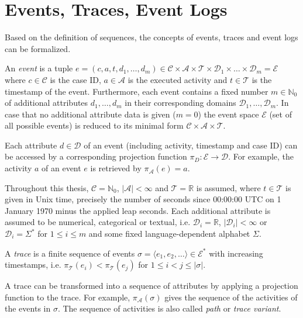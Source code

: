 \section{Events, Traces, Event Logs}

Based on the definition of sequences, the concepts of events, traces and event logs can be formalized.

\begin{definition}[Event]
An  \textit{event} is a tuple $e = (c,a,t,d_1,\dots, d_m) \in \mathcal{C} \times \mathcal{A}  \times \mathcal{T} \times \mathcal{D}_1 \times \dots \times \mathcal{D}_m =  \mathcal{E}$ where  $c \in \mathcal{C} $ is the case ID, $a \in \mathcal{A}$ is the executed activity and $t \in \mathcal{T}$ is the timestamp of the event.
Furthermore, each event contains a fixed number $m \in \mathbb{N}_0$ of additional attributes $d_1, \dots, d_m$ in their corresponding domains $\mathcal{D}_1, \dots , \mathcal{D}_m$.
In case that no additional attribute data is given ($m = 0$) the event space $\mathcal{E}$ (set of all possible events) is reduced to its minimal form $\mathcal{C} \times \mathcal{A}  \times \mathcal{T}$.
\end{definition}

Each attribute $d \in \mathcal{D}$ of an event (including activity, timestamp and case ID) can be accessed by a corresponding projection function $\pi_D \colon \mathcal{E} \to \mathcal{D}$.
For example, the activity $a$ of an event $e$ is retrieved by $\pi_\mathcal{A}(e) = a$.

Throughout this thesis,  $\mathcal{C} = \mathbb{N}_0$, $|\mathcal{A}| < \infty$ and $ \mathcal{T} = \mathbb{R}$ is assumed, where $t \in \mathcal{T}$ is given in Unix time, precisely the number of seconds since 00:00:00 UTC on 1 January 1970 minus the applied leap seconds.
Each additional attribute is assumed to be numerical, categorical or textual, i.e. $\mathcal{D}_i = \mathbb{R}$, $|\mathcal{D}_i| < \infty$ or $\mathcal{D}_i = \Sigma^\ast$  for $1 \leq i \leq m$ and some fixed language-dependent alphabet $\Sigma$.

\begin{definition}[Trace]
	A \textit{trace} is a finite sequence of events $\sigma = \langle e_1, e_2, \dots\rangle \in  \mathcal{E}^\ast$ with increasing timestamps, i.e. $\pi_\mathcal{T} (e_i) < \pi_\mathcal{T} (e_j) $ for $1 \leq i < j \leq |\sigma|$.
\end{definition}


A trace can be transformed into a sequence of attributes by applying a projection function to the trace.
For example, $\pi_\mathcal{A}(\sigma)$ gives the sequence of the activities of the events in $\sigma$.
The sequence of activities is also called \textit{path} or \textit{trace variant}.

